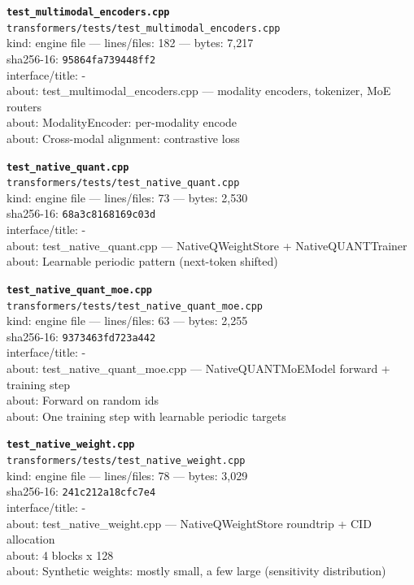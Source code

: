 \noindent\textbf{\texttt{test\_multimodal\_encoders.cpp}}\\
\texttt{transformers/tests/test\_multimodal\_encoders.cpp}\\
kind: engine file --- lines/files: 182 --- bytes: 7,217\\
sha256-16: \texttt{95864fa739448ff2}\\
interface/title: -\\
about: test\_multimodal\_encoders.cpp — modality encoders, tokenizer, MoE routers\\
about: ModalityEncoder: per-modality encode\\
about: Cross-modal alignment: contrastive loss\\
\vspace*{6.0pt}

\noindent\textbf{\texttt{test\_native\_quant.cpp}}\\
\texttt{transformers/tests/test\_native\_quant.cpp}\\
kind: engine file --- lines/files: 73 --- bytes: 2,530\\
sha256-16: \texttt{68a3c8168169c03d}\\
interface/title: -\\
about: test\_native\_quant.cpp — NativeQWeightStore + NativeQUANTTrainer\\
about: Learnable periodic pattern (next-token shifted)\\
\vspace*{6.0pt}
\newpage

\noindent\textbf{\texttt{test\_native\_quant\_moe.cpp}}\\
\texttt{transformers/tests/test\_native\_quant\_moe.cpp}\\
kind: engine file --- lines/files: 63 --- bytes: 2,255\\
sha256-16: \texttt{9373463fd723a442}\\
interface/title: -\\
about: test\_native\_quant\_moe.cpp — NativeQUANTMoEModel forward + training step\\
about: Forward on random ids\\
about: One training step with learnable periodic targets\\
\vspace*{6.0pt}

\noindent\textbf{\texttt{test\_native\_weight.cpp}}\\
\texttt{transformers/tests/test\_native\_weight.cpp}\\
kind: engine file --- lines/files: 78 --- bytes: 3,029\\
sha256-16: \texttt{241c212a18cfc7e4}\\
interface/title: -\\
about: test\_native\_weight.cpp — NativeQWeightStore roundtrip + CID allocation\\
about: 4 blocks x 128\\
about: Synthetic weights: mostly small, a few large (sensitivity distribution)\\
\vspace*{6.0pt}

